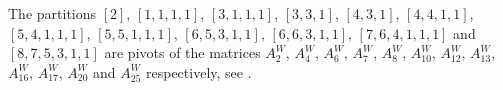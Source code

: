 \documentclass[a4paper, 12pt, reqno]{amsart}
\theoremstyle{remark}
\begin{document}
The partitions $[2]$, $[1, 1, 1, 1]$, $[3, 1, 1, 1]$, $[3, 3, 1]$, $[4, 3, 1]$, $[4, 4, 1, 1]$, $[5, 4, 1, 1, 1]$, $[5, 5, 1, 1, 1]$, $[6, 5, 3, 1, 1]$, $[6, 6, 3, 1, 1]$, $[7, 6, 4, 1, 1, 1]$ and $[8, 7, 5, 3, 1, 1]$ are pivots of the matrices $A^W_2$, $A^W_4$, $A^W_6$, $A^W_7$, $A^W_8$, $A^W_{10}$, $A^W_{12}$, $A^W_{13}$, $A^W_{16}$, $A^W_{17}$, $A^W_{20}$ and $A^W_{25}$ respectively, see \cite[ising-modules-1-16.ipynb]{sagemath2}.



\end{document}
